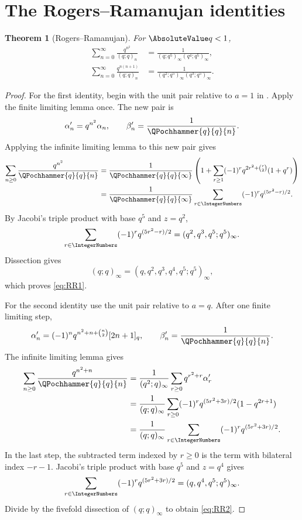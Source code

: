 \documentclass[11pt,a4paper,oneside,openany]{book}
\newtheorem{theorem}{Theorem}[chapter]
\theoremstyle{definition}
\theoremstyle{remark}
\begin{document}
\section{The Rogers--Ramanujan identities}

\begin{theorem}[Rogers--Ramanujan]\label{thm:rogers-ramanujan}
For $\AbsoluteValue q<1$,
\begin{align}
 \sum_{n=0}^{\infty}\frac{q^{n^2}}{(q;q)_n}
 &=\frac1{(q;q^5)_\infty(q^4;q^5)_\infty},\label{eq:RR1}\\
 \sum_{n=0}^{\infty}\frac{q^{n(n+1)}}{(q;q)_n}
 &=\frac1{(q^2;q^5)_\infty(q^3;q^5)_\infty}.
 \label{eq:RR2}
\end{align}
\end{theorem}

\begin{proof}
For the first identity, begin with the unit pair relative to $a=1$ in .  Apply the finite limiting lemma once.  The new pair is
\[
 \alpha_n'=q^{n^2}\alpha_n,
 \qquad
 \beta_n'=\frac1{\QPochhammer{q}{q}{n}}.
\]  Applying the infinite limiting lemma to this new pair gives
\begin{align*}
 \sum_{n\ge0}\frac{q^{n^2}}{\QPochhammer{q}{q}{n}}
 &=\frac1{\QPochhammer{q}{q}{\infty}}
 \left(1+\sum_{r\ge1}(-1)^r
 q^{2r^2+\binom r2}(1+q^r)\right)\\
 &=\frac1{\QPochhammer{q}{q}{\infty}}
 \sum_{r\in\IntegerNumbers}(-1)^rq^{(5r^2-r)/2}.
\end{align*}
By Jacobi's triple product with base $q^5$ and $z=q^2$,
\[
 \sum_{r\in\IntegerNumbers}(-1)^rq^{(5r^2-r)/2}
 =(q^2,q^3,q^5;q^5)_\infty.
\]
Dissection gives
\[
 (q;q)_\infty=(q,q^2,q^3,q^4,q^5;q^5)_\infty,
\]
which proves \eqref{eq:RR1}.

For the second identity use the unit pair relative to $a=q$.  After one finite limiting step,
\[
 \alpha_n'=(-1)^nq^{n^2+n+\binom n2}[2n+1]_q,
 \qquad
 \beta_n'=\frac1{\QPochhammer{q}{q}{n}}.
\]
The infinite limiting lemma gives
\begin{align*}
 \sum_{n\ge0}\frac{q^{n^2+n}}{\QPochhammer{q}{q}{n}}
 &=\frac1{(q^2;q)_\infty}
 \sum_{r\ge0}q^{r^2+r}\alpha_r'\\
 &=\frac1{(q;q)_\infty}
 \sum_{r\ge0}(-1)^rq^{(5r^2+3r)/2}(1-q^{2r+1})\\
 &=\frac1{(q;q)_\infty}
 \sum_{r\in\IntegerNumbers}(-1)^rq^{(5r^2+3r)/2}.
\end{align*}
In the last step, the subtracted term indexed by $r\ge0$ is the term with bilateral index $-r-1$.  Jacobi's triple product with base $q^5$ and $z=q^4$ gives
\[
 \sum_{r\in\IntegerNumbers}(-1)^rq^{(5r^2+3r)/2}
 =(q,q^4,q^5;q^5)_\infty.
\]
Divide by the fivefold dissection of $(q;q)_\infty$ to obtain \eqref{eq:RR2}.
\end{proof}
\end{document}
